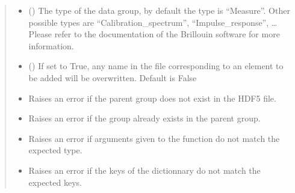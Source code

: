 \documentclass[letterpaper,10pt,english]{sphinxmanual}
\begin{document}
\begin{fulllineitems}
\begin{fulllineitems}
\begin{quote}
\begin{description}
\begin{itemize}
\item {} 
\sphinxAtStartPar
{} (\sphinxstyleliteralemphasis{\sphinxupquote{, }}) \textendash{} The type of the data group, by default the type is “Measure”. Other possible types are “Calibration\_spectrum”, “Impulse\_response”, … Please refer to the documentation of the Brillouin software for more information.

\item {} 
\sphinxAtStartPar
{} (\sphinxstyleliteralemphasis{\sphinxupquote{, }}) \textendash{} If set to True, any name in the file corresponding to an element to be added will be overwritten. Default is False

\end{itemize}

\begin{itemize}
\item {} 
\sphinxAtStartPar
{\hyperref[\detokenize{source/HDF5_BLS:HDF5_BLS.WrapperError.WrapperError_StructureError}]{}} \textendash{} Raises an error if the parent group does not exist in the HDF5 file.

\item {} 
\sphinxAtStartPar
{\hyperref[\detokenize{source/HDF5_BLS:HDF5_BLS.WrapperError.WrapperError_Overwrite}]{}} \textendash{} Raises an error if the group already exists in the parent group.

\item {} 
\sphinxAtStartPar
{\hyperref[\detokenize{source/HDF5_BLS:HDF5_BLS.WrapperError.WrapperError_ArgumentType}]{}} \textendash{} Raises an error if arguments given to the function do not match the expected type.

\item {} 
\sphinxAtStartPar
{} \textendash{} Raises an error if the keys of the dictionnary do not match the expected keys.

\end{itemize}


\end{description}
\end{quote}
\end{fulllineitems}
\end{fulllineitems}
\end{document}
